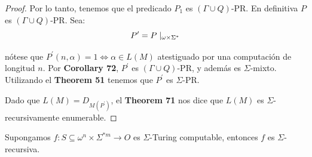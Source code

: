 \begin{proof}
    \PN Por lo tanto, tenemos que el predicado $P_1$ es $(\Gamma \cup Q)$-PR. En definitiva $P$ es $(\Gamma \cup Q)$-PR.
    \PN Sea:
    \[
      P^{\prime }=P\mid _{\omega \times \Sigma^{\ast}}
    \]

    \PN nótese que $P^{\prime}(n,\alpha) = 1 \Leftrightarrow \alpha \in L(M)$ atestiguado por una computación de
    longitud $n$.
    \PN Por \textbf{Corollary 72}, $P^{\prime}$ es $(\Gamma \cup Q)$-PR, y además es $\Sigma$-mixto. Utilizando el
    \textbf{Theorem 51} tenemos que $P^{\prime}$ es $\Sigma $-PR.

    \PN Dado que $L(M) = D_{M(P^{\prime})}$, el \textbf{Theorem 71} nos dice que $L(M)$ es $\Sigma$-recursivamente
    enumerable.
  \end{proof}

	\begin{theorem}
		\PN Supongamos $f: S \subseteq \omega^{n} \times \Sigma^{\ast m} \rightarrow O$ es $\Sigma$-Turing computable,
    entonces $f$ es $\Sigma$-recursiva.
  \end{theorem}
